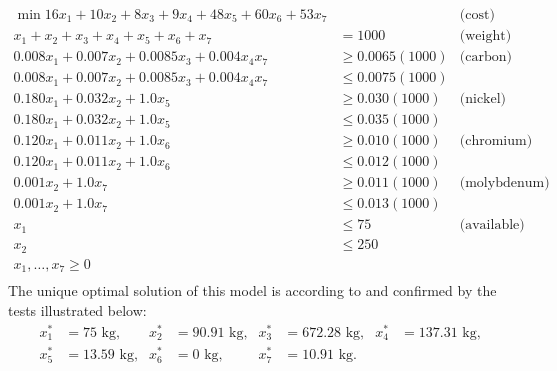 \documentclass[a4paper,10 pt,titlepage,twoside]{book}
\theoremstyle{plain}
\theoremstyle{definition}
\theoremstyle{remark}
\begin{document}
\begin{align*}
\min16x_{1}+10x_{2}+8x_{3}+9x_{4}+48x_{5}+60x_{6}+53x_{7}& &\text{(cost)}&\\
x_{1}+x_{2}+x_{3}+x_{4}+x_{5}+x_{6} + x_{7}&= 1000&\text{(weight)}&\\
0.008x_{1}+0.007x_{2}+0.0085x_{3}+0.004x_{4}x_{7}&\geq 0.0065(1000)&\text{(carbon)}&\\
0.008x_{1}+0.007x_{2} + 0.0085x_{3} + 0.004x_{4}x_{7}&\leq 0.0075(1000)&\\
0.180x_{1}+0.032x_{2} + 1.0x_{5}&\geq 0.030(1000)& \text{(nickel)}&\\
0.180x_{1}+0.032x_{2} + 1.0x_{5}&\leq 0.035(1000)&\\
0.120x_{1}+0.011x_{2} + 1.0x_{6}&\geq 0.010(1000)& \text{(chromium)}&\\
0.120x_{1}+0.011x_{2} + 1.0x_{6}&\leq 0.012(1000)&\\
0.001x_{2} + 1.0x_{7}&\geq 0.011(1000)& \text{(molybdenum)}&\\
0.001x_{2} + 1.0x_{7}&\leq 0.013(1000)&\\
x_{1}&\leq 75&\text{(available)}&\\
x_{2}&\leq 250 &&\\
x_{1},\dots, x_{7}\geq 0\\
\end{align*}
The unique optimal solution of this model is according to \cite{RR} and confirmed by the tests illustrated below:
\begin{align*}
x_{1}^{*} &=  75\text{ kg,} & x_{2}^{*}&=  90.91\text{ kg,} & x_{3}^{*} &= 672.28 \text{ kg,} & x_{4}^{*} &= 137.31 \text{ kg,}\\
x_{5}^{*} &= 13.59 \text{ kg,}& x_{6}^{*}&= 0\text{ kg,}  & x_{7}^{*} &= 10.91 \text{ kg.} &&\\
\end{align*}
\end{document}
